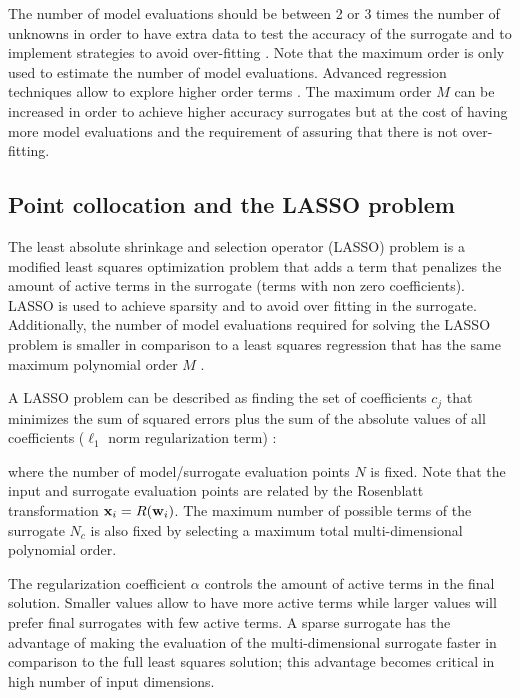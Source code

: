 \documentclass[preprint,12pt]{elsarticle}
\begin{document}
The number of model evaluations should be between 2 or 3 times the number of unknowns in order to have extra data to test the accuracy of the surrogate and to implement strategies to avoid over-fitting \cite{blatman2011adaptive}. Note that the maximum order is only used to estimate the number of model evaluations. Advanced regression techniques allow to explore higher order terms \cite{tibshirani1996regression, blatman2011adaptive}. The maximum order $M$ can be increased in order to achieve higher accuracy surrogates but at the cost of having more model evaluations and the requirement of assuring that there is not over-fitting.

\subsection{Point collocation and the LASSO problem}
\label{sec_LASSO}

The least absolute shrinkage and selection operator (LASSO) problem is a modified least squares optimization problem that adds a term that penalizes the amount of active terms in the surrogate (terms with non zero coefficients). LASSO is used to achieve sparsity and to avoid over fitting in the surrogate. Additionally, the number of model evaluations required for solving the LASSO problem is smaller in comparison to a least squares regression that has the same maximum polynomial order $M$ \cite{blatman2011adaptive}.

A LASSO problem can be described as finding the set of coefficients $c_j$ that minimizes the sum of squared errors plus the sum of the absolute values of all coefficients ($\ell_1$ norm regularization term) \cite{tibshirani1996regression}:



\noindent where the number of model/surrogate evaluation points $N$ is fixed. Note that the input and surrogate evaluation points are related by the Rosenblatt transformation $\mathbf{x}_i=R(\mathbf{w}_i)$. The maximum number of possible terms of the surrogate $N_c$ is also fixed by selecting a maximum total multi-dimensional polynomial order.

The regularization coefficient $\alpha$ controls the amount of active terms in the final solution. Smaller values allow to have more active terms while larger values will prefer final surrogates with few active terms. A sparse surrogate has the advantage of making the evaluation of the multi-dimensional surrogate faster in comparison to the full least squares solution; this advantage becomes critical in high number of input dimensions.
\end{document}
